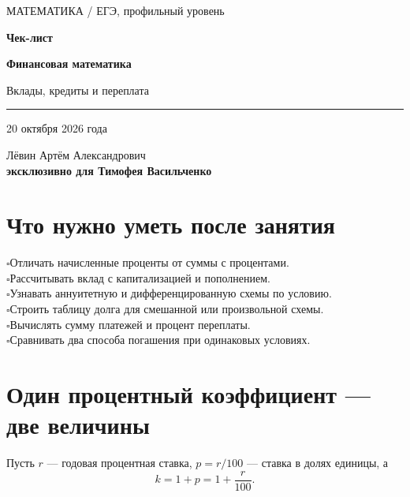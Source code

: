 \documentclass[a4paper,12pt]{article}
\newcommand{\checkitem}{\(\square\)\enspace}
\begin{document}
\thispagestyle{empty}
\vspace*{42mm}
\begin{center}
{\color{accent}\large МАТЕМАТИКА \quad / \quad ЕГЭ, профильный уровень}\par
\vspace{18mm}
{\Huge\bfseries Чек-лист}\par
\vspace{8mm}
{\LARGE\bfseries\color{darkaccent}Финансовая математика}\par
\vspace{4mm}
{\Large Вклады, кредиты и переплата}\par
\vspace{17mm}
{\color{accent}\rule{68mm}{0.8pt}}\par
\vspace{16mm}
{\large 20 октября 2026 года}\par
\vspace{13mm}
{\normalsize\color{textgray}Лёвин Артём Александрович}\\[5pt]
{\normalsize\bfseries эксклюзивно для Тимофея Васильченко}
\end{center}
\vfill
\noindent{}
\vspace*{8mm}
\clearpage

\section*{Что нужно уметь после занятия}
\checkitem Отличать начисленные проценты от суммы с процентами.\\
\checkitem Рассчитывать вклад с капитализацией и пополнением.\\
\checkitem Узнавать аннуитетную и дифференцированную схемы по условию.\\
\checkitem Строить таблицу долга для смешанной или произвольной схемы.\\
\checkitem Вычислять сумму платежей и процент переплаты.\\
\checkitem Сравнивать два способа погашения при одинаковых условиях.

\section{Один процентный коэффициент --- две величины}
Пусть \(r\) --- годовая процентная ставка, \(p=r/100\) --- ставка в долях единицы, а
\[
\boxed{k=1+p=1+\frac r{100}}.
\]
\end{document}
